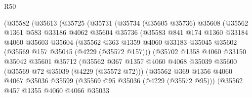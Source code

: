 \begin{lexlean}{R50}
\begin{coremodule}
                    (@35582
                      (@35613
                        (@35725
                          (@35731
                            (@35734
                              (@35605 @35736)
                              @35608
                              (@35562
                                @1361
                                @583
                                @33186
                                @4062
                                @35604
                                @35736
                                (@35583
                                  @841
                                  @174
                                  @1360
                                  @33184
                                  @4060
                                  @35603
                                  @35604
                                  (@35562
                                    @363
                                    @1359
                                    @4060
                                    @33183
                                    @35045
                                    @35602
                                    (@35569 @157 @35045 (@4229 (@35572 @157)))
                                    (@35702
                                      @1358
                                      @4060
                                      @33150
                                      @35042
                                      @35601
                                      @35712
                                      (@35562
                                        @367
                                        @1357
                                        @4060
                                        @4068
                                        @35039
                                        @35600
                                        (@35569 @72 @35039 (@4229 (@35572 @72)))
                                        (@35562
                                          @369
                                          @1356
                                          @4060
                                          @4067
                                          @35036
                                          @35599
                                          (@35569 @95 @35036 (@4229 (@35572 @95)))
                                          (@35562
                                            @457
                                            @1355
                                            @4060
                                            @4066
                                            @35033

\end{coremodule}
\end{lexlean}
